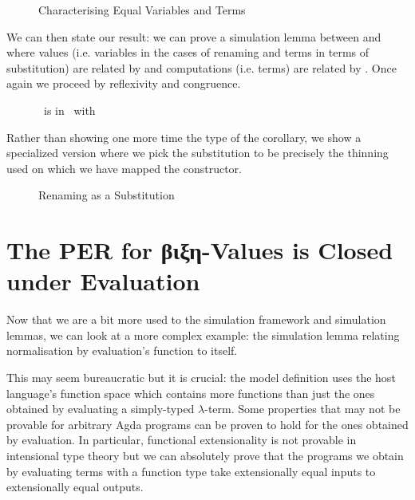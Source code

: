 \begin{figure}[h]
\caption{Characterising Equal Variables and Terms\label{fig:vartermR}}
\end{figure}

We can then state our result: we can prove a simulation lemma between 
and  where values (i.e. variables in the cases of renaming and terms
in terms of substitution) are related by  and computations (i.e. terms)
are related by . Once again we proceed by reflexivity and congruence.

\begin{figure}[h]
\caption{~is in ~with \label{fig:renissub}}
\end{figure}

Rather than showing one more time the type of the corollary, we show a specialized
version where we pick the substitution to be precisely the thinning used on which we
have mapped the  constructor.

\begin{figure}[h]
\caption{Renaming as a Substitution\label{fig:renassub}}
\end{figure}

\section{The PER for βιξη-Values is Closed under Evaluation}

Now that we are a bit more used to the simulation framework and simulation
lemmas, we can look at a more complex example: the simulation lemma relating
normalisation by evaluation's  function to itself.

This may seem bureaucratic but it is crucial: the model definition uses
the host language's function space which contains more functions than
just the ones obtained by evaluating a simply-typed $λ$-term. Some
properties that may not be provable for arbitrary Agda programs can
be proven to hold for the ones obtained by evaluation. In particular,
functional extensionality is not provable in intensional type theory
but we can absolutely prove that the programs we obtain by evaluating
terms with a function type take extensionally equal inputs to
extensionally equal outputs.

